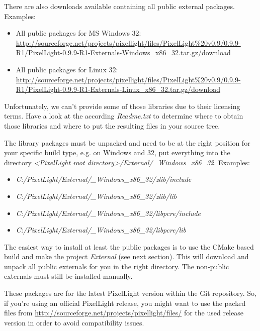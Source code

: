 There are also downloads available containing all public external packages. Examples:
\begin{itemize}
\item{All public packages for MS Windows \SI{32}{\bit}: \url{http://sourceforge.net/projects/pixellight/files/PixelLight%20v0.9/0.9.9-R1/PixelLight-0.9.9-R1-Externals-Windows_x86_32.tar.gz/download}}
\item{All public packages for Linux \SI{32}{\bit}: \url{http://sourceforge.net/projects/pixellight/files/PixelLight%20v0.9/0.9.9-R1/PixelLight-0.9.9-R1-Externals-Linux_x86_32.tar.gz/download}}
\end{itemize}

Unfortunately, we can't provide some of those libraries due to their licensing terms. Have a look at the according \emph{Readme.txt} to determine where to obtain those libraries and where to put the resulting files in your source tree.

The library packages must be unpacked and need to be at the right position for your specific build type, e.g. on Windows and \SI{32}{\bit}, put everything into the directory \emph{\textless PixelLight root directory\textgreater /External/\_Windows\_x86\_32}. Examples:
\begin{itemize}
\item{\emph{C:/PixelLight/External/\_Windows\_x86\_32/zlib/include}}
\item{\emph{C:/PixelLight/External/\_Windows\_x86\_32/zlib/lib}}
\item{\emph{C:/PixelLight/External/\_Windows\_x86\_32/libpcre/include}}
\item{\emph{C:/PixelLight/External/\_Windows\_x86\_32/libpcre/lib}}
\end{itemize}

The easiest way to install at least the public packages is to use the CMake based build and make the project \emph{External} (see next section). This will download and unpack all public externals for you in the right directory. The non-public externals must still be installed manually.

These packages are for the latest PixelLight version within the Git repository. So, if you're using an official PixelLight release, you might want to use the packed files from \url{http://sourceforge.net/projects/pixellight/files/} for the used release version in order to avoid compatibility issues.